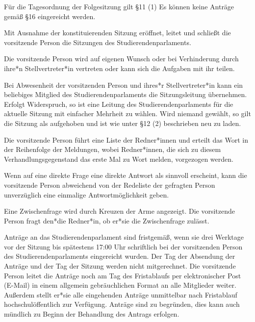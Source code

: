 \documentclass[10pt,a4paper]{scrartcl}
\begin{document}
\begin{contract}
	Für die Tagesordnung der Folgesitzung gilt §11 (1) Es können keine
  Anträge gemäß §16 eingereicht werden.



\label{leitung-der-sitzung}

Mit Ausnahme der konstituierenden Sitzung eröffnet, leitet und
schließt die vorsitzende Person die Sitzungen des Studierendenparlaments.

Die vorsitzende Person wird auf eigenen Wunsch oder bei Verhinderung
durch ihre*n Stellvertreter*in vertreten oder kann sich die Aufgaben mit ihr teilen.

Bei Abwesenheit der vorsitzenden Person und ihres*r Stellvertreter*in
kann ein beliebiges Mitglied des Studierendenparlaments die
Sitzungsleitung übernehmen. Erfolgt Widerspruch, so ist eine Leitung des
Studierendenparlaments für die aktuelle Sitzung mit einfacher Mehrheit
zu wählen. Wird niemand gewählt, so gilt die Sitzung als aufgehoben und
ist wie unter §12 (2) beschrieben neu zu laden.


\label{reihenfolge-der-rednerinnen}

Die vorsitzende Person führt eine Liste der Redner*innen und erteilt
das Wort in der Reihenfolge der Meldungen, wobei Redner*innen, die
sich zu diesem Verhandlungsgegenstand das erste Mal zu Wort melden,
vorgezogen werden.

Wenn auf eine direkte Frage eine direkte Antwort als sinnvoll
erscheint, kann die vorsitzende Person abweichend von der Redeliste
der gefragten Person unverzüglich eine einmalige Antwortmöglichkeit
geben.

Eine Zwischenfrage wird durch Kreuzen der Arme angezeigt. Die
vorsitzende Person fragt den*die Redner*in, ob er*sie die
Zwischenfrage zulässt.


\label{fristgemuxe4uxdfe-antruxe4ge}

Anträge an das Studierendenparlament sind fristgemäß, wenn sie drei
Werktage vor der Sitzung bis spätestens 17:00 Uhr schriftlich bei der
vorsitzenden Person des Studierendenparlaments eingereicht wurden. Der
Tag der Absendung der Anträge und der Tag der Sitzung werden nicht
mitgerechnet. Die vorsitzende Person leitet die Anträge noch am Tag des
Fristablaufs per elektronischer Post (E-Mail) in einem allgemein
gebräuchlichen Format an alle Mitglieder weiter. Außerdem stellt er*sie
alle eingehenden Anträge unmittelbar nach Fristablauf
hochschulöffentlich zur Verfügung. Anträge sind zu begründen, dies kann
auch mündlich zu Beginn der Behandlung des Antrags erfolgen.



\end{contract}
\end{document}
